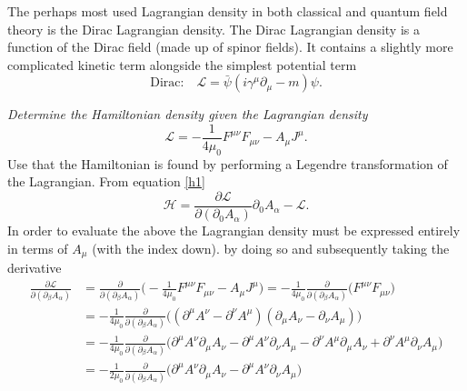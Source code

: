 \begin{example}
	The perhaps most used Lagrangian density in both classical and quantum field theory is the Dirac Lagrangian density. The Dirac Lagrangian density is a function of the Dirac field (made up of spinor fields). It contains a slightly more complicated kinetic term alongside the simplest potential term
	\begin{equation}
		\text{Dirac:}\quad \mathcal{L}=\bar{\psi}(i\gamma^\mu \partial_\mu-m)\psi.
	\end{equation}  
\end{example}
\begin{example}
	\emph{Determine the Hamiltonian density given the Lagrangian density}
	\begin{equation}
		\mathcal{L}=-\frac{1}{4\mu_0}F^{\mu\nu}F_{\mu\nu}-A_{\mu}J^{\mu}.
	\end{equation} 
	Use that the Hamiltonian is found by performing a Legendre transformation of the Lagrangian. From equation \eqref{h1}
	\begin{equation}
		\mathcal{H}=\frac{\partial \mathcal{L}}{\partial(\partial_0 A_\alpha)}\partial_{0}A_\alpha-\mathcal{L}.
	\end{equation} 
	In order to evaluate the above the Lagrangian density must be expressed entirely in terms of $A_\mu$ (with the index down). by doing so and subsequently taking the derivative
	\begin{equation}
		\begin{split}
			\frac{\partial \mathcal{L}}{\partial(\partial_\beta A_\alpha)}&=\frac{\partial}{\partial(\partial_\beta A_\alpha)}\bigg(-\frac{1}{4\mu_0}F^{\mu\nu}F_{\mu\nu}-A_{\mu}J^{\mu}\bigg)=-\frac{1}{4\mu_0}\frac{\partial}{\partial(\partial_\beta A_\alpha)}\bigg(F^{\mu\nu}F_{\mu\nu}\bigg)\\
			&=-\frac{1}{4\mu_0}\frac{\partial}{\partial(\partial_\beta A_\alpha)}\bigg((\partial^\mu A^\nu-\partial^\nu A^\mu)(\partial_\mu A_\nu-\partial_\nu A_\mu)\bigg)\\
			&=-\frac{1}{4\mu_0}\frac{\partial}{\partial(\partial_\beta A_\alpha)}\bigg(\partial^\mu A^\nu\partial_\mu A_\nu-\partial^\mu A^\nu\partial_\nu A_\mu-\partial^\nu A^\mu\partial_\mu A_\nu+\partial^\nu A^\mu\partial_\nu A_\mu\bigg)\\
			&=-\frac{1}{2\mu_0}\frac{\partial}{\partial(\partial_\beta A_\alpha)}\bigg(\partial^\mu A^\nu\partial_\mu A_\nu-\partial^\mu A^\nu\partial_\nu A_\mu\bigg)\\

\end{split}
\end{equation}
\end{example}
